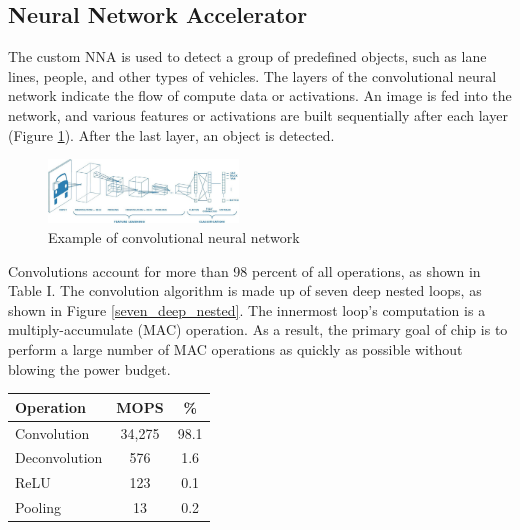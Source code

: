 \documentclass[letterpaper, 10 pt, conference]{ieeeconf}  %
\begin{document}
\subsection{Neural Network Accelerator}

The custom NNA is used to detect a group of predefined objects, such as lane lines, people, and other types of vehicles. The layers of the convolutional neural network indicate the flow of compute data or activations. An image is fed into the network, and various features or activations are built sequentially after each layer (Figure \ref{cnn}). After the last layer, an object is detected\cite{saha_2018}.

\begin{figure}[hbt!]
\centering
\includegraphics[width=0.45\textwidth]{gfx/cnn.jpeg}
\caption{Example of convolutional neural network}
\label{cnn}
\end{figure}

Convolutions account for more than 98 percent of all operations, as shown in Table I. The convolution algorithm is made up of seven deep nested loops, as shown in Figure \ref{seven_deep_nested}. The innermost loop's computation is a multiply-accumulate (MAC) operation\cite{fsd_computer}. As a result, the primary goal of chip is to perform a large number of MAC operations as quickly as possible without blowing the power budget.

\begin{table}[hbt!]
\centering
\begin{tabular}{@{}lcc@{}}
\toprule
Operation                     & MOPS                     & \%                       \\ \midrule
\multicolumn{1}{|l|}{Convolution}   & \multicolumn{1}{c|}{34,275} & \multicolumn{1}{c|}{98.1} \\ \midrule
\multicolumn{1}{|l|}{Deconvolution} & \multicolumn{1}{c|}{576}    & \multicolumn{1}{c|}{1.6}  \\ \midrule
\multicolumn{1}{|l|}{ReLU}    & \multicolumn{1}{c|}{123} & \multicolumn{1}{c|}{0.1} \\ \midrule
\multicolumn{1}{|l|}{Pooling} & \multicolumn{1}{c|}{13}  & \multicolumn{1}{c|}{0.2} \\ \bottomrule
\end{tabular}
\label{tab:cnn_operation}
\end{table}
\end{document}
